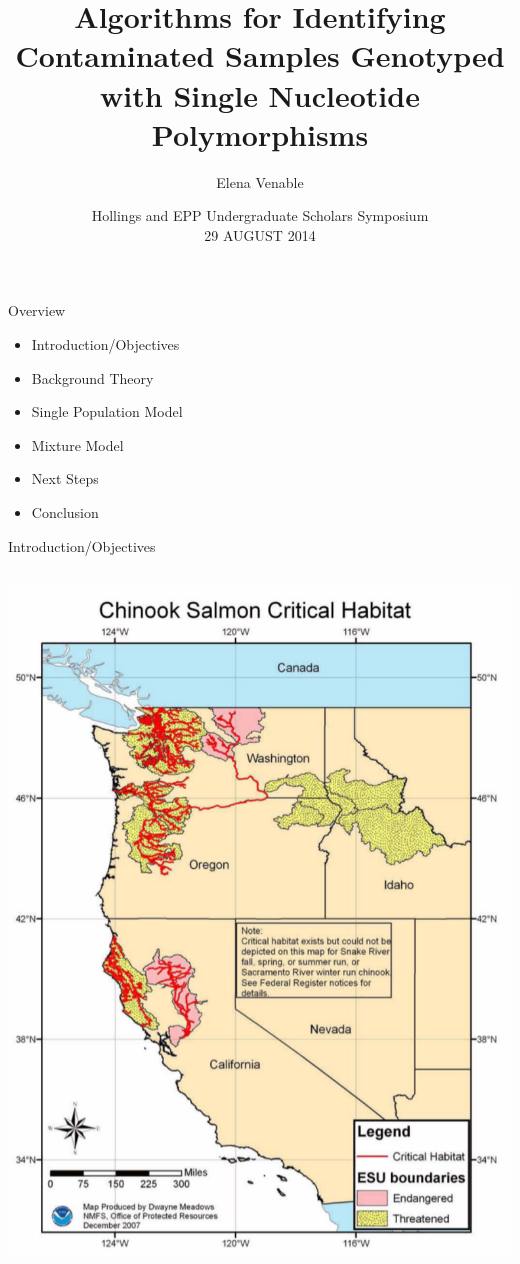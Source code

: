 \documentclass[letter,graphicx]{beamer}
\title[SNP contamination identification with Bayesian methods\hspace{2em}\insertframenumber] %
{Algorithms for Identifying Contaminated Samples Genotyped with Single Nucleotide Polymorphisms}
\subtitle{} %
\author[Elena Venable] %
{Elena Venable}
\institute[Brown Univeristy] %
{
Brown University \\ Applied Mathematics - Biology \\ Healthy Oceans \\ Southwest Fisheries Science Center, Santa Cruz, CA \\ Eric C. Anderson
}
\date[CSGM--2014] %
{
 Hollings and EPP Undergraduate Scholars Symposium \\ 29 AUGUST 2014}
\begin{document}
\begin{frame}
  \titlepage
\end{frame}

\begin{frame}{Overview}
   \begin{itemize}
	\item Introduction/Objectives
	\item Background Theory
	\item Single Population Model
	\item Mixture Model
	\item Next Steps
	\item Conclusion
   \end{itemize}
\end{frame}

\begin{frame}{Introduction/Objectives}
  \begin{columns}[T]
 
 \column{2.75 in}
 \centering
   \includegraphics[width=.8\textwidth]{images/chinooksalmon}
 

\end{columns}
\end{frame}
\end{document}
